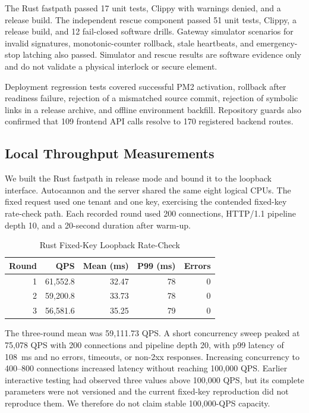 The Rust fastpath passed 17 unit tests, Clippy with warnings denied, and a release build. The independent rescue component passed 51 unit tests, Clippy, a release build, and 12 fail-closed software drills. Gateway simulator scenarios for invalid signatures, monotonic-counter rollback, stale heartbeats, and emergency-stop latching also passed. Simulator and rescue results are software evidence only and do not validate a physical interlock or secure element.

Deployment regression tests covered successful PM2 activation, rollback after readiness failure, rejection of a mismatched source commit, rejection of symbolic links in a release archive, and offline environment backfill. Repository guards also confirmed that 109 frontend API calls resolve to 170 registered backend routes.

\subsection{Local Throughput Measurements}
\label{subsec:throughput}

We built the Rust fastpath in release mode and bound it to the loopback interface. Autocannon and the server shared the same eight logical CPUs. The fixed request used one tenant and one key, exercising the contended fixed-key rate-check path. Each recorded round used 200 connections, HTTP/1.1 pipeline depth 10, and a 20-second duration after warm-up.

\begin{table}[htbp]
\centering
\caption{Rust Fixed-Key Loopback Rate-Check}
\label{tab:rust-fixed-key-throughput}
\begin{tabular}{|r|r|r|r|r|}
\hline
\textbf{Round} & \textbf{QPS} & \textbf{Mean (ms)} & \textbf{P99 (ms)} & \textbf{Errors} \\
\hline
1 & 61,552.8 & 32.47 & 78 & 0 \\
2 & 59,200.8 & 33.73 & 78 & 0 \\
3 & 56,581.6 & 35.25 & 79 & 0 \\
\hline
\end{tabular}
\end{table}

The three-round mean was 59,111.73 QPS. A short concurrency sweep peaked at 75,078 QPS with 200 connections and pipeline depth 20, with p99 latency of 108~ms and no errors, timeouts, or non-2xx responses. Increasing concurrency to 400--800 connections increased latency without reaching 100,000 QPS. Earlier interactive testing had observed three values above 100,000 QPS, but its complete parameters were not versioned and the current fixed-key reproduction did not reproduce them. We therefore do not claim stable 100,000-QPS capacity.

